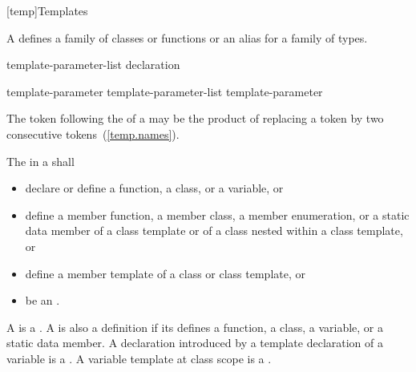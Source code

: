 [temp]{Templates}%


%

\pnum
A  defines a family of classes or functions or an alias for a
family of types.

%
%
\begin{bnf}
\br
   template-parameter-list \terminal{>} declaration
\end{bnf}

\begin{bnf}
\br
  template-parameter\br
  template-parameter-list \terminal{,} template-parameter
\end{bnf}

\enternote The \tcode{>} token following the
 of a
may be the product of replacing a
\tcode{>{>}} token by two consecutive \tcode{>}
tokens~(\ref{temp.names}).\exitnote

The
in a
shall

\begin{itemize}
\item declare or define a function, a class, or a variable, or

\item define a member function, a member class, a member enumeration, or a static data member of a
class template or of a class nested within a class template, or

\item define a member template of a class or class template, or

\item be an .
\end{itemize}

A  is a .
%
A  is also a definition
if its  defines a function, a class, a variable, or a
static data member. A declaration introduced by a template declaration of a
%
%
%
variable is a . A variable template at class scope is a
.

